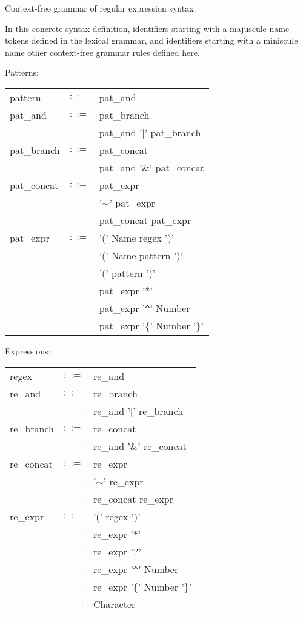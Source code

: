 \begin{defn}
   \label{defn-gram-cfg}
   Context-free grammar of regular expression syntax.

   In this concrete syntax definition, identifiers starting with a majuscule
   name tokens defined in the lexical grammar, and identifiers starting with a
   miniscule name other context-free grammar rules defined here.

   Patterns:

   \begin{tabular}{lrl}
      pattern		& $::=$	& pat\_and			\\
      pat\_and		& $::=$	& pat\_branch			\\
      			& $|$	& pat\_and '$|$' pat\_branch	\\
      pat\_branch	& $::=$	& pat\_concat			\\
      			& $|$	& pat\_and '\&' pat\_concat	\\
      pat\_concat	& $::=$	& pat\_expr			\\
			& $|$	& '$\sim$' pat\_expr		\\
			& $|$	& pat\_concat pat\_expr		\\
      pat\_expr		& $::=$	& '(' Name regex ')'		\\
			& $|$	& '(' Name pattern ')'		\\
			& $|$	& '(' pattern ')'		\\
			& $|$	& pat\_expr '*'			\\
                        & $|$	& pat\_expr '\verb!^!' Number	\\
                        & $|$	& pat\_expr '\{' Number '\}'	\\
   \end{tabular}

   \needspace{5cm}
   Expressions:

   \begin{tabular}{lrl}
      regex		& $::=$	& re\_and			\\
      re\_and		& $::=$	& re\_branch			\\
      			& $|$	& re\_and '$|$' re\_branch	\\
      re\_branch	& $::=$	& re\_concat			\\
      			& $|$	& re\_and '\&' re\_concat	\\
      re\_concat	& $::=$	& re\_expr			\\
			& $|$	& '$\sim$' re\_expr		\\
			& $|$	& re\_concat re\_expr		\\
      re\_expr		& $::=$	& '(' regex ')'			\\
			& $|$	& re\_expr '*'			\\
			& $|$	& re\_expr '?'			\\
                        & $|$	& re\_expr '\verb!^!' Number	\\
                        & $|$	& re\_expr '\{' Number '\}'	\\
                        & $|$	& Character			\\
   \end{tabular}
\end{defn}

